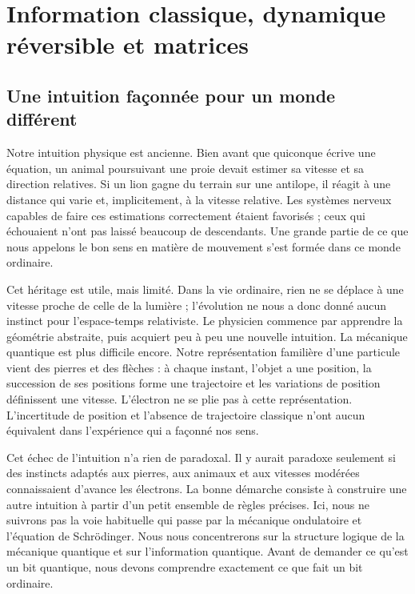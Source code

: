 \chapter{Information classique, dynamique réversible et matrices}


\section{Une intuition façonnée pour un monde différent}

Notre intuition physique est ancienne. Bien avant que quiconque écrive une équation, un animal poursuivant une proie devait estimer sa vitesse et sa direction relatives. Si un lion gagne du terrain sur une antilope, il réagit à une distance qui varie et, implicitement, à la vitesse relative. Les systèmes nerveux capables de faire ces estimations correctement étaient favorisés ; ceux qui échouaient n’ont pas laissé beaucoup de descendants. Une grande partie de ce que nous appelons le bon sens en matière de mouvement s’est formée dans ce monde ordinaire.

Cet héritage est utile, mais limité. Dans la vie ordinaire, rien ne se déplace à une vitesse proche de celle de la lumière ; l’évolution ne nous a donc donné aucun instinct pour l’espace-temps relativiste. Le physicien commence par apprendre la géométrie abstraite, puis acquiert peu à peu une nouvelle intuition. La mécanique quantique est plus difficile encore. Notre représentation familière d’une particule vient des pierres et des flèches : à chaque instant, l’objet a une position, la succession de ses positions forme une trajectoire et les variations de position définissent une vitesse. L’électron ne se plie pas à cette représentation. L’incertitude de position et l’absence de trajectoire classique n’ont aucun équivalent dans l’expérience qui a façonné nos sens.

Cet échec de l’intuition n’a rien de paradoxal. Il y aurait paradoxe seulement si des instincts adaptés aux pierres, aux animaux et aux vitesses modérées connaissaient d’avance les électrons. La bonne démarche consiste à construire une autre intuition à partir d’un petit ensemble de règles précises. Ici, nous ne suivrons pas la voie habituelle qui passe par la mécanique ondulatoire et l’équation de Schr\"odinger. Nous nous concentrerons sur la structure logique de la mécanique quantique et sur l’information quantique. Avant de demander ce qu’est un bit quantique, nous devons comprendre exactement ce que fait un bit ordinaire.

